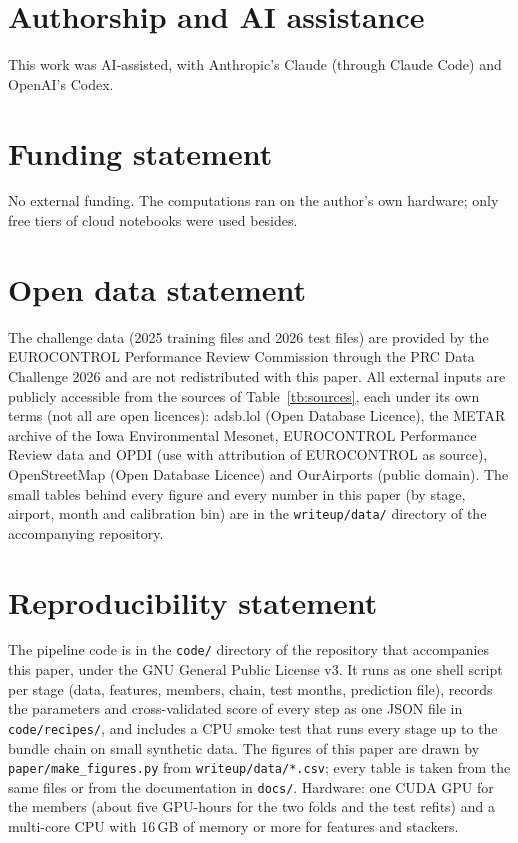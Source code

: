 \documentclass[
  manuscript=article,
  layout=preprint,
  year=2026,
  volume=x,
]{extra/joas}
\begin{document}
\section*{Authorship and AI assistance}
This work was AI-assisted, with Anthropic's Claude (through Claude Code) and OpenAI's Codex.

\section*{Funding statement}
No external funding. The computations ran on the author's own hardware; only free tiers of cloud notebooks were used besides.

\section*{Open data statement}
The challenge data (2025 training files and 2026 test files) are provided by the EUROCONTROL Performance Review Commission through the
PRC Data Challenge 2026 \cite{prc2026challenge} and are not redistributed with this paper. All external inputs are publicly accessible
from the sources of Table~\ref{tb:sources}, each under its own terms (not all are open licences): adsb.lol (Open Database Licence), the METAR archive of the Iowa Environmental Mesonet, EUROCONTROL Performance Review data and OPDI (use with
attribution of EUROCONTROL as source), OpenStreetMap (Open Database Licence) and OurAirports (public domain). The small tables behind
every figure and every number in this paper (by stage, airport, month and calibration bin) are in the \texttt{writeup/data/} directory of
the accompanying repository.

\section*{Reproducibility statement}
The pipeline code is in the \texttt{code/} directory of the repository that accompanies this paper, under
the GNU General Public License v3. It runs as one shell script per stage (data, features, members, chain, test months, prediction file),
records the parameters and cross-validated score of every step as one JSON file in \texttt{code/recipes/}, and includes a CPU smoke test
that runs every stage up to the bundle chain on small synthetic data. The figures of this paper are drawn by \texttt{paper/make\_figures.py} from
\texttt{writeup/data/*.csv}; every table is taken from the same files or from the documentation in \texttt{docs/}. Hardware: one CUDA GPU
for the members (about five GPU-hours for the two folds and the test refits) and a multi-core CPU with 16\,GB of memory or more for
features and stackers.

\printbibliography
\end{document}
